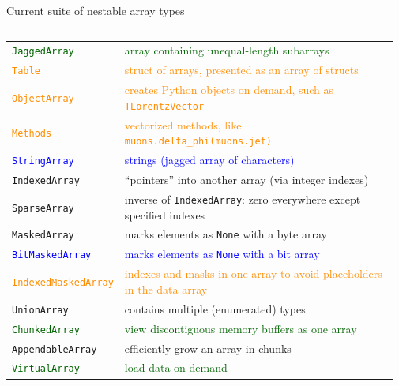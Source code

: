 \documentclass[aspectratio=169]{beamer}
\begin{document}
\begin{frame}{Current suite of nestable array types}
\vspace{0.35 cm}
\begin{columns}
\begin{tabular}{p{0.26\linewidth} p{0.71\linewidth}}
\textcolor{darkgreen}{\texttt{JaggedArray}}        & \textcolor{darkgreen}{array containing unequal-length subarrays} \\
\textcolor{darkorange}{\texttt{Table}}                & \textcolor{darkorange}{struct of arrays, presented as an array of structs} \\
\textcolor{darkorange}{\texttt{ObjectArray}}          & \textcolor{darkorange}{creates Python objects on demand, such as \texttt{TLorentzVector}} \\
\textcolor{darkorange}{\texttt{Methods}}              & \textcolor{darkorange}{vectorized methods, like \texttt{muons.delta_phi(muons.jet)}} \\
\textcolor{blue}{\texttt{StringArray}}         & \textcolor{blue}{strings (jagged array of characters)} \\
\texttt{IndexedArray}                          & ``pointers'' into another array (via integer indexes) \\
\texttt{SparseArray}                           & inverse of {\tt IndexedArray}: zero everywhere except specified indexes \\
\texttt{MaskedArray}                           & marks elements as {\tt None} with a byte array \\
\textcolor{blue}{\texttt{BitMaskedArray}}      & \textcolor{blue}{marks elements as {\tt None} with a bit array} \\
\textcolor{darkorange}{\texttt{IndexedMaskedArray}}   & \textcolor{darkorange}{indexes and masks in one array to avoid placeholders in the data array} \\
\texttt{UnionArray}                            & contains multiple (enumerated) types \\
\textcolor{darkgreen}{\texttt{ChunkedArray}}       & \textcolor{darkgreen}{view discontiguous memory buffers as one array} \\
\texttt{AppendableArray}                       & efficiently grow an array in chunks \\
\textcolor{darkgreen}{\texttt{VirtualArray}}       & \textcolor{darkgreen}{load data on demand} \\
\end{tabular}


\end{columns}
\end{frame}
\end{document}
